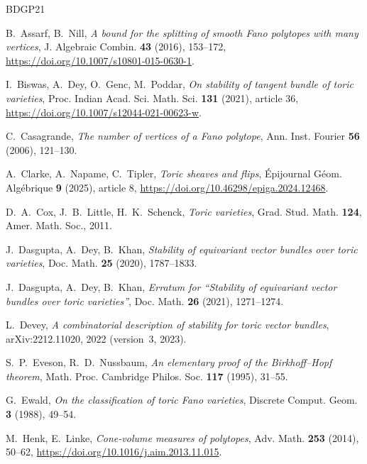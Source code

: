 \begin{thebibliography}{BDGP21}

 B.~Assarf, B.~Nill, \emph{A bound for the
splitting of smooth Fano polytopes with many vertices}, J. Algebraic
Combin. \textbf{43} (2016), 153--172,
\url{https://doi.org/10.1007/s10801-015-0630-1}.

 I.~Biswas, A.~Dey, O.~Genc,
M.~Poddar, \emph{On stability of tangent bundle of toric varieties},
Proc. Indian Acad. Sci. Math. Sci. \textbf{131} (2021), article 36,
\url{https://doi.org/10.1007/s12044-021-00623-w}.

 C.~Casagrande, \emph{The number of vertices of a Fano polytope},
Ann. Inst. Fourier \textbf{56} (2006), 121--130.

 A.~Clarke, A.~Napame, C.~Tipler,
\emph{Toric sheaves and flips}, \'Epijournal G\'eom. Alg\'ebrique
\textbf{9} (2025), article 8,
\url{https://doi.org/10.46298/epiga.2024.12468}.

 D.~A.~Cox, J.~B.~Little, H.~K.~Schenck, \emph{Toric
varieties}, Grad. Stud. Math. \textbf{124}, Amer. Math. Soc., 2011.

 J.~Dasgupta, A.~Dey, B.~Khan,
\emph{Stability of equivariant vector bundles over toric varieties},
Doc. Math. \textbf{25} (2020), 1787--1833.

 J.~Dasgupta, A.~Dey, B.~Khan,
\emph{Erratum for ``Stability of equivariant vector bundles over toric
varieties''}, Doc. Math. \textbf{26} (2021), 1271--1274.

 L.~Devey, \emph{A combinatorial description of
stability for toric vector bundles}, arXiv:2212.11020, 2022
(version~3, 2023).

 S.~P.~Eveson, R.~D.~Nussbaum,
\emph{An elementary proof of the Birkhoff--Hopf theorem}, Math. Proc.
Cambridge Philos. Soc. \textbf{117} (1995), 31--55.

 G.~Ewald, \emph{On the classification of toric Fano varieties},
Discrete Comput. Geom. \textbf{3} (1988), 49--54.

 M.~Henk, E.~Linke,
\emph{Cone-volume measures of polytopes}, Adv. Math. \textbf{253}
(2014), 50--62, \url{https://doi.org/10.1016/j.aim.2013.11.015}.


\end{thebibliography}
